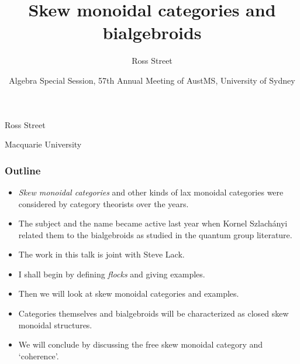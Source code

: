 \documentclass{beamer}
\title%
{\textbf{Skew monoidal categories and bialgebroids}}
\author{Ross Street}
\institute{Macquarie University}
\date[Sept-Oct 2013]{\small Algebra Special Session,
57th Annual Meeting of AustMS,
University of Sydney}
\begin{document}


\begin{frame}%

  \begin{centering}
    {\inserttitle

\medskip 

{\small Ross Street}

{\small Macquarie University} 

\medskip
{}
}

\vfill

\centerline{\insertdate}

  \end{centering}


\end{frame}




\begin{frame}
  \frametitle{Outline}
\begin{itemize}
\item {\em Skew monoidal categories} and other kinds of lax monoidal categories were considered by category theorists over the years.
\pause
\item The subject and the name became active last year when Kornel Szlach\'anyi related them to the bialgebroids as studied in the quantum group literature.
\pause
\item The work in this talk is joint with Steve Lack.
\pause
\item I shall begin by defining {\em flocks} and giving examples.
\pause
\item Then we will look at skew monoidal categories and examples.
\pause 
\item Categories themselves and bialgebroids will be characterized as closed skew monoidal structures.
\pause 
\item We will conclude by discussing the free skew monoidal category and `coherence'.
\end{itemize}
\end{frame}
\end{document}
